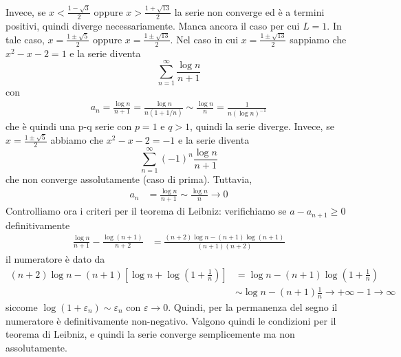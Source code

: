 \documentclass[a4paper]{article}
\begin{document}
{    Invece, se \(x < \frac{1 - \sqrt{3}}{2}\) oppure \(x > \frac{1 + \sqrt{13}}{2}\) la serie non converge ed è a termini positivi,
    quindi diverge necessariamente.
    Manca ancora il caso per cui \(L=1\).
    In tale caso, \(x = \frac{1 \pm \sqrt{5}}{2}\) oppure \(x = \frac{1 \pm \sqrt{13}}{2}\).
    Nel caso in cui \(x = \frac{1 \pm \sqrt{13}}{2}\) sappiamo che \(x^2 - x - 2 = 1\)
    e la serie diventa
    \[
        \sum_{n=1}^\infty \frac{\log n}{n+1}
    \]
    con
    \begin{align*}
        a_n = \frac{\log n}{n+1} = \frac{\log n}{n(1 + 1/n)} \sim \frac{\log n}{n}
        = \frac{1}{n{(\log n)}^{-1}}
    \end{align*}
    che è quindi una p-q serie con \(p=1\) e \(q > 1\), quindi la serie diverge.
    Invece, se \(x = \frac{1 \pm \sqrt{5}}{2}\) abbiamo che \(x^2 - x - 2 = -1\)
    e la serie diventa
    \[
        \sum_{n=1}^\infty {(-1)}^n \frac{\log n}{n+1}
    \]
    che non converge assolutamente (caso di prima). Tuttavia,
    \begin{align*}
        a_n &= \frac{\log n}{n+1} \sim \frac{\log n}{n} \to 0
    \end{align*}
    Controlliamo ora i criteri per il teorema di Leibniz:
    verifichiamo se \(a-a_{n+1} \geq 0\) definitivamente
    \begin{align*}
        \frac{\log n}{n+1} - \frac{\log (n+1)}{n+2} &=
        \frac{(n+2)\log n - (n+1)\log (n+1)}{(n+1)(n+2)}
    \end{align*}
    il numeratore è dato da
    \begin{align*}
        (n+2)\log n - (n+1) \left[\log n + \log\left(1 + \frac{1}{n}\right)\right] &=
        \log n - (n+1)\log \left(1 + \frac{1}{n}\right) \\
        &\sim \log n - (n+1)\frac{1}{n} \to +\infty - 1 \to \infty
    \end{align*}
    siccome \(\log\left(1 + \varepsilon_n\right) \sim \varepsilon_n\) con \(\varepsilon \to 0\).
    Quindi, per la permanenza del segno il numeratore è definitivamente non-negativo.
    Valgono quindi le condizioni per il teorema di Leibniz, e quindi la serie
    converge semplicemente ma non assolutamente.
}
\end{document}
